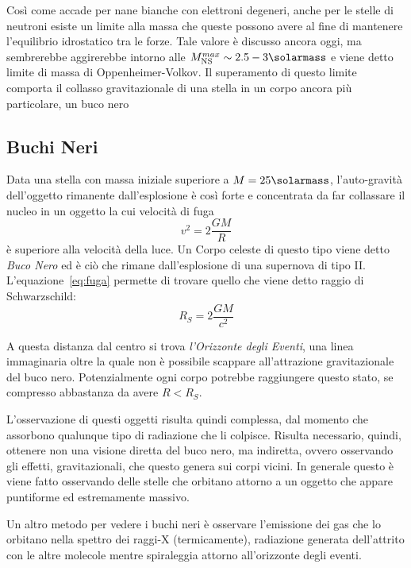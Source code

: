 Così come accade per nane bianche con elettroni degeneri, anche per le stelle di neutroni esiste un limite alla massa che queste possono avere al fine di mantenere l'equilibrio idrostatico tra le forze. Tale valore è discusso ancora oggi, ma sembrerebbe aggirerebbe intorno alle $M_\textup{NS}^{max} \sim 2.5 - 3 \si{\solarmass}$ e viene detto limite di massa di Oppenheimer-Volkov. Il superamento di questo limite comporta il collasso gravitazionale di una stella in un corpo ancora più particolare, un buco nero
\subsection{Buchi Neri}\label{black-holes}

Data una stella con massa iniziale superiore a $M = 25\si{\solarmass}$, l'auto-gravità dell'oggetto rimanente dall'esplosione è così forte e concentrata da far collassare il nucleo in un oggetto la cui velocità di fuga
\begin{equation}\label{eq:fuga}
    v^2 = 2 \frac{GM}{R}
\end{equation}
è superiore alla velocità della luce. Un Corpo celeste di questo tipo viene detto \emph{Buco Nero} ed è ciò che rimane dall'esplosione di una supernova di tipo II. L'equazione~\eqref{eq:fuga} permette di trovare quello che viene detto raggio di Schwarzschild:
\begin{equation}\label{eq:schwarzschild}
    R_S = 2 \frac{GM}{c^2}
\end{equation}

A questa distanza dal centro si trova \emph{l'Orizzonte degli Eventi}, una linea immaginaria oltre la quale non è possibile scappare all'attrazione gravitazionale del buco nero. Potenzialmente ogni corpo potrebbe raggiungere questo stato, se compresso abbastanza da avere $R<R_S$.

L'osservazione di questi oggetti risulta quindi complessa, dal momento che assorbono qualunque tipo di radiazione che li colpisce. Risulta necessario, quindi, ottenere non una visione diretta del buco nero, ma indiretta, ovvero osservando gli effetti, gravitazionali, che questo genera sui corpi vicini. In generale questo è viene fatto osservando delle stelle che orbitano attorno a un oggetto che appare puntiforme ed estremamente massivo.

Un altro metodo per vedere i buchi neri è osservare l'emissione dei gas che lo orbitano nella spettro dei raggi-X (termicamente), radiazione generata dell'attrito con le altre molecole mentre spiraleggia attorno all'orizzonte degli eventi.

